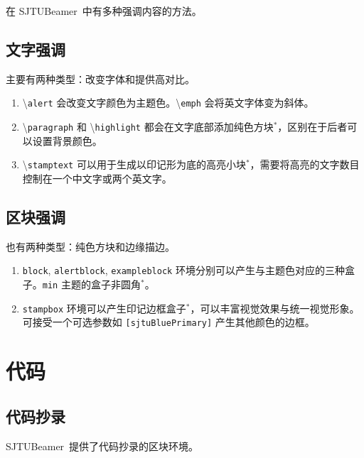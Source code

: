 \documentclass[
    UTF8,
    heading=true,
    12pt,
    a4paper
]{ctexrep}
\newenvironment{commentlist}{\begin{enumerate}\small}{\end{enumerate}}
\newcommand{\cmd}[1]{\textbackslash{}\texttt{#1}}
\def\themename{\textsf{SJTUBeamer}}
\begin{document}
在 \themename\ 中有多种强调内容的方法。

\section{文字强调}

主要有两种类型：改变字体和提供高对比。


\begin{commentlist}
  \item \cmd{alert} 会改变文字颜色为主题色。\cmd{emph} 会将英文字体变为斜体。
  \item \cmd{paragraph} 和 \cmd{highlight} 都会在文字底部添加纯色方块$^*$，区别在于后者可以设置背景颜色。
  \item \cmd{stamptext} 可以用于生成以印记形为底的高亮小块$^*$，需要将高亮的文字数目控制在一个中文字或两个英文字。
\end{commentlist}

\section{区块强调}

也有两种类型：纯色方块和边缘描边。



\begin{commentlist}
  \item \texttt{block}, \texttt{alertblock}, \texttt{exampleblock} 环境分别可以产生与主题色对应的三种盒子。\texttt{min} 主题的盒子非圆角$^*$。
  \item \texttt{stampbox} 环境可以产生印记边框盒子$^*$，可以丰富视觉效果与统一视觉形象。可接受一个可选参数如 \texttt{[sjtuBluePrimary]} 产生其他颜色的边框。
\end{commentlist}

\chapter{代码}

\section{代码抄录}

\themename\ 提供了代码抄录的区块环境。

\end{document}
